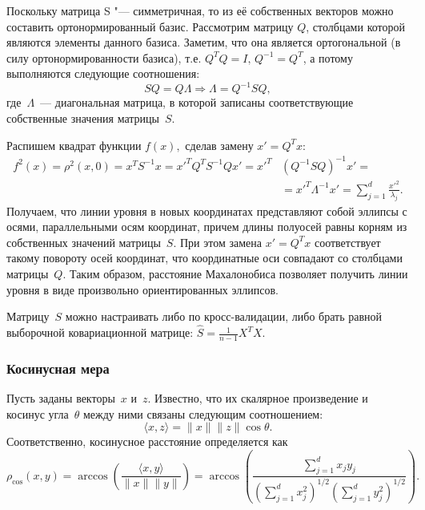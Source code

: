\documentclass[12pt,fleqn]{article}
\begin{document}
        \begin{esSolution}
        Поскольку матрица S "--- симметричная, то из её собственных векторов можно составить ортонормированный базис. Рассмотрим матрицу $Q$, столбцами которой являются элементы данного базиса. Заметим, что она является ортогональной (в силу ортонормированности базиса), т.е. $Q^T Q = I, \, Q^{-1} = Q^T$, а потому выполняются следующие соотношения:
        \[
        S Q = Q \Lambda \Rightarrow \Lambda = Q^{-1} S Q,
        \]
        где~$\Lambda$~--- диагональная матрица, в которой записаны соответствующие собственные значения матрицы~$S$.
        
        Распишем квадрат функции $f(x),$ сделав замену $x' = Q^T x$:
        \begin{align*}
        	f^2(x) = \rho^2(x, 0) = 
        	x^T S^{-1} x = {x'}^T Q^T S^{-1} Q x' = 
        	x'^T &\left(Q^{-1} S Q \right)^{-1} x' = \\
        	&= x'^T \Lambda^{-1} x' = \sum_{j=1}^d \frac{x'^2}{\lambda_j}.
        \end{align*}
        Получаем, что линии уровня в новых координатах представляют собой эллипсы с осями, параллельными осям координат, причем длины полуосей равны корням из собственных значений матрицы~$S$. При этом замена $x' = Q^T x$ соответствует такому повороту осей координат, что координатные оси совпадают со
        столбцами матрицы~$Q$.
        Таким образом, расстояние Махалонобиса позволяет получить линии уровня в виде произвольно ориентированных эллипсов.
        \end{esSolution}

        Матрицу~$S$ можно настраивать либо по кросс-валидации,
        либо брать равной выборочной ковариационной матрице:
        $\hat S = \frac{1}{n - 1} X^T X$.


        \subsubsection{Косинусная мера}
        Пусть заданы векторы~$x$ и~$z$.
        Известно, что их скалярное произведение и косинус угла~$\theta$ между ними связаны следующим соотношением:
        \[
            \langle x, z \rangle = \|x\| \|z\| \cos \theta.
        \]
        Соответственно, косинусное расстояние определяется как
        \[
            \rho_\text{cos}(x, y)
            =
            \arccos\left(\frac{\langle x, y \rangle}{\|x\| \|y\|}\right)
            =
            \arccos\left(
            \frac{
                \sum_{j = 1}^{d} x_j y_j
            }{
                \left(\sum_{j = 1}^{d} x_j^2 \right)^{1/2} \left(\sum_{j = 1}^{d} y_j^2\right)^{1/2}
            }
            \right).
        \]
\end{document}
